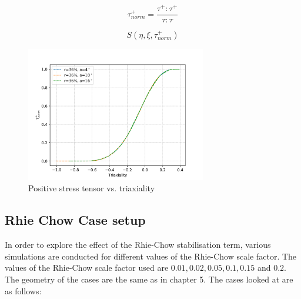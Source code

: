 \documentclass[sn-mathphys,Numbered,draft]{sn-jnl}%
\begin{document}
\begin{equation}
\label{eqn:normalisedTauPositive}
    \tau^+_{norm}=\frac{\tau^+ : \tau^+}{\tau : \tau}
\end{equation}

\begin{equation}
\label{eqn:alternativeLemaiterDenominator}
    S(\eta,\xi,\tau^+_{norm})
\end{equation}

\begin{figure}[htb]
\begin{center}
	\includegraphics[width=0.7\textwidth]{./Figures/SimulationAndAnalysis/compareCellData/tauTriaxCompare.png}
\caption{Positive stress tensor vs. triaxiality}
\label{fig:notchedRoundBAr}
\end{center}
\end{figure}





\subsection{Rhie Chow Case setup}
\label{rhieChowExplorationCases}

In order to explore the effect of the Rhie-Chow stabilisation term, various simulations are conducted for different values of the Rhie-Chow scale factor. The values of the Rhie-Chow scale factor used are $0.01,0.02,0.05,0.1,0.15$ and $0.2$. The geometry of the cases are the same as in chapter 5. The cases looked at are as follows:
\end{document}
